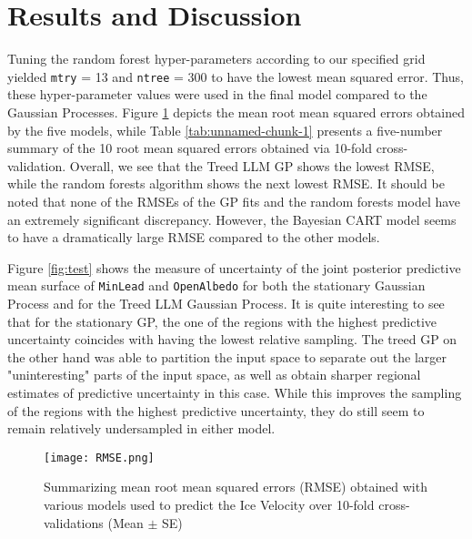 \documentclass{article}\usepackage[]{graphicx}\usepackage[]{color}
\begin{document}
\section*{Results and Discussion}

Tuning the random forest hyper-parameters according to our specified grid yielded \texttt{mtry} = 13 and \texttt{ntree} = 300 to have the lowest mean squared error. Thus, these hyper-parameter values were used in the final model compared to the Gaussian Processes. Figure \ref{fig:Tschunks1und2} depicts the mean root mean squared errors obtained by the five models, while Table \ref{tab:unnamed-chunk-1} presents a five-number summary of the 10 root mean squared errors obtained via 10-fold cross-validation. Overall, we see that the Treed LLM GP shows the lowest RMSE, while the random forests algorithm shows the next lowest RMSE. It should be noted that none of the RMSEs of the GP fits and the random forests model have an extremely significant discrepancy. However, the Bayesian CART model seems to have a dramatically large RMSE compared to the other models. 
\par \smallskip
Figure \ref{fig:test} shows the measure of uncertainty of the joint posterior predictive mean surface of \texttt{MinLead} and \texttt{OpenAlbedo} for both the stationary Gaussian Process and for the Treed LLM Gaussian Process. It is quite interesting to see that for the stationary GP, the one of the regions with the highest predictive uncertainty coincides with having the lowest relative sampling. The treed GP on the other hand was able to partition the input space to separate out the larger "uninteresting" parts of the input space, as well as obtain sharper regional estimates of predictive uncertainty in this case. While this improves the sampling of the regions with the highest predictive uncertainty, they do still seem to remain relatively undersampled in either model.

\begin{figure}[H]
  \centering
  \texttt{[image: RMSE.png]} 
  \caption{Summarizing mean root mean squared errors (RMSE) obtained with various models used to predict the Ice Velocity over 10-fold cross-validations (Mean $\pm$ SE)} 
  \label{fig:Tschunks1und2}
\end{figure}
\end{document}
